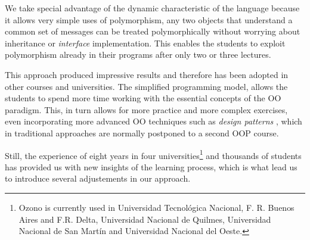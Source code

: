 We take special advantage of the dynamic characteristic of the language because it allows very simple uses of polymorphism, 
\ie any two objects that understand a common set of messages can be treated polymorphically without worrying about inheritance or \emph{interface} implementation.
This enables the students to exploit polymorphism already in their programs after only two or three lectures.

\medskip
This approach produced impressive results and therefore has been adopted in other courses and universities.
The simplified programming model, allows the students to spend more time working with the essential concepts of the OO paradigm.
This, in turn allows for more practice and more complex exercises, even incorporating more advanced OO techniques such as \emph{design patterns} \cite{Gamm03a},
which in traditional approaches are normally postponed to a second OOP course.





Still, the experience of eight years in four universities\footnote{Ozono is currently used in Universidad Tecnológica Nacional, F. R. Buenos Aires and F.R. Delta, 
Universidad Nacional de Quilmes, Universidad Nacional de San Martín and Universidad Nacional del Oeste.}
and thousands of students has provided us with new insights of the learning process, 
which is what lead us to introduce several adjustements in our approach.

